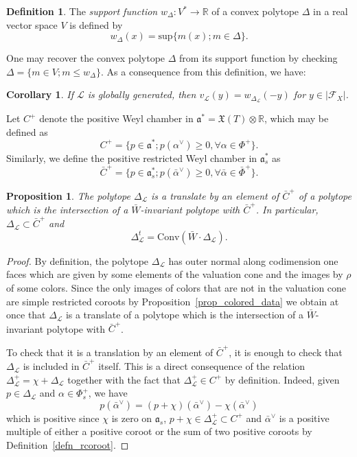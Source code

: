 \documentclass{amsart}
\newtheorem{cor}[thm]{Corollary}
\newtheorem{prop}[thm]{Proposition}
\theoremstyle{definition}
\newtheorem{defn}[thm]{Definition}
\begin{document}
\begin{defn}
The \emph{support function}
$w_{\Delta} : V^* \longrightarrow \mathbb{R}$ of a convex 
polytope $\Delta$ in a real vector space $V$ is defined by 
\[
w_{\Delta}(x)=\mathrm{sup} \{ m(x); m\in \Delta \}.
\] 
\end{defn}

One may recover the convex polytope $\Delta$ from its support function by checking
$\Delta=\{m\in V; m\leq w_{\Delta} \}$. As a consequence from this definition, 
we have:

\begin{cor}
\label{cor_gg}
If $\mathcal{L}$ is globally generated, 
then $v_{\mathcal{L}}(y)=w_{\Delta_{\mathcal{L}}}(-y)$ for $y\in |\mathcal{F}_X|$. 
\end{cor}

Let $C^+$ denote the positive Weyl chamber in 
$\mathfrak{a}^*=\mathfrak{X}(T)\otimes\mathbb{R}$, 
which may be defined as
\[
C^+=\{p\in \mathfrak{a}^*; p(\alpha^{\vee})\geq 0, \forall \alpha\in \Phi^+\}.
\]
Similarly, we define the positive restricted Weyl chamber 
in $\mathfrak{a}_s^*$ as 
\[
\bar{C}^+=\{p\in \mathfrak{a}_s^*; p(\bar{\alpha}^{\vee})\geq 0, \forall \bar{\alpha}\in \bar{\Phi}^+\}.
\]

\begin{prop}
\label{prop_toric_vs_special}
The polytope $\Delta_{\mathcal{L}}$ is a translate 
by an element of $\bar{C}^+$ of a polytope which is the intersection of a 
$\bar{W}$-invariant polytope with $\bar{C}^+$. In particular, 
$\Delta_{\mathcal{L}}\subset \bar{C}^+$
and 
\[
\Delta^t_{\mathcal{L}} = \mathrm{Conv}(\bar{W}\cdot \Delta_{\mathcal{L}}).
\]
\end{prop}

\begin{proof}
By definition, the polytope $\Delta_{\mathcal{L}}$ has outer normal along 
codimension one faces which are given by some elements of the valuation cone 
and the images by $\rho$ of some colors.
Since the only images of colors that are not in the valuation cone 
are simple restricted coroots by Proposition~\ref{prop_colored_data}
we obtain at once that $\Delta_{\mathcal{L}}$ is a translate of a polytope 
which is the intersection of a $\bar{W}$-invariant polytope 
with $\bar{C}^+$. 

To check that it is a translation by an element 
of $\bar{C}^+$, it is enough to check that $\Delta_{\mathcal{L}}$ is 
included in $\bar{C}^+$ itself. 
This is a direct consequence of the relation 
$\Delta^+_{\mathcal{L}}=\chi + \Delta_{\mathcal{L}}$ 
together with the fact that $\Delta^+_{\mathcal{L}}\in C^+$ 
by definition. 
Indeed, given $p\in \Delta_{\mathcal{L}}$ and $\alpha\in \Phi_s^+$, we have 
\[
p(\bar{\alpha}^{\vee})= 
(p+\chi)(\bar{\alpha}^{\vee})-\chi(\bar{\alpha}^{\vee}) 
\]
which is positive since 
$\chi$ is zero on $\mathfrak{a}_s$, $p+\chi\in\Delta_{\mathcal{L}}^+\subset C^+$
and $\bar{\alpha}^{\vee}$ is a positive multiple of either a positive coroot 
or the sum of two positive 
coroots by Definition~\ref{defn_rcoroot}. 
\end{proof}
\end{document}
